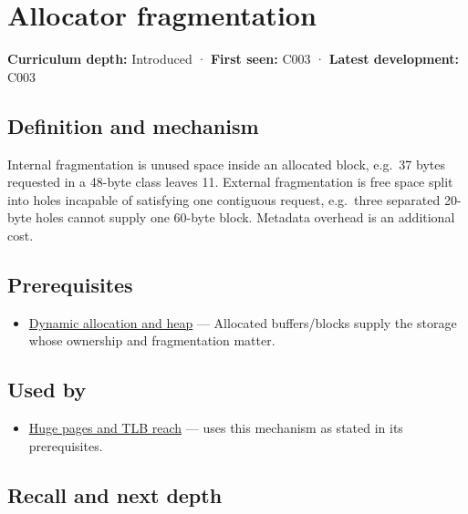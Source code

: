 \hypertarget{appendix-a7c50686d81f}{}\label{referencestart:appendix-a7c50686d81f}
\section{Allocator fragmentation}\label{appendix-a7c50686d81f-allocator-fragmentation}

\textbf{Curriculum depth:} Introduced · \textbf{First seen:} C003 · \textbf{Latest development:} C003

\subsection{Definition and mechanism}\label{appendix-a7c50686d81f-definition-and-mechanism}

Internal fragmentation is unused space inside an allocated block, e.g.~37 bytes requested in a 48-byte class leaves 11. External fragmentation is free space split into holes incapable of satisfying one contiguous request, e.g.~three separated 20-byte holes cannot supply one 60-byte block. Metadata overhead is an additional cost.

\subsection{Prerequisites}\label{appendix-a7c50686d81f-prerequisites}

\begin{itemize}
\tightlist
\item
  \hyperref[appendix-c3480f7d9ff3]{Dynamic allocation and heap} --- Allocated buffers/blocks supply the storage whose ownership and fragmentation matter.
\end{itemize}

\subsection{Used by}\label{appendix-a7c50686d81f-used-by}

\begin{itemize}
\tightlist
\item
  \hyperref[appendix-ce688d1acdab]{Huge pages and TLB reach} --- uses this mechanism as stated in its prerequisites.
\end{itemize}

\subsection{Recall and next depth}\label{appendix-a7c50686d81f-recall-and-next-depth}


